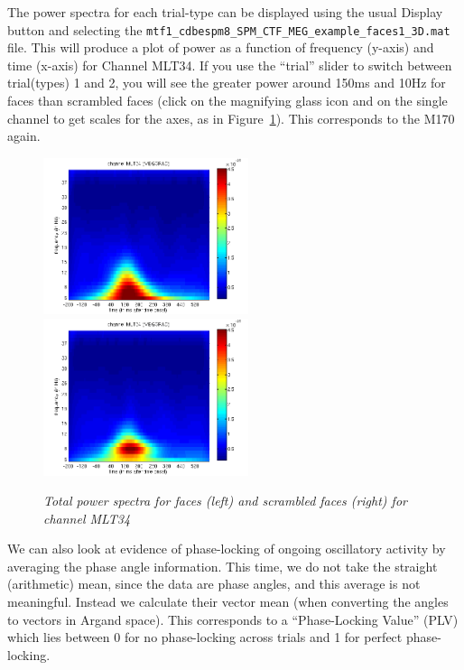 The power spectra for each trial-type can be displayed using the usual Display button and selecting the \texttt{mtf1\_\-cdbespm8\_\-SPM\_\-CTF\_\-MEG\_\-example\_\-faces1\_3D.mat} file. This will produce a plot of power as a function of frequency (y-axis) and time (x-axis) for Channel MLT34. If you use the ``trial'' slider to switch between trial(types) 1 and 2, you will see the greater power around 150ms and 10Hz for faces than scrambled faces (click on the magnifying glass icon and on the single channel to get scales for the axes, as in Figure~\ref{multimodal:fig:13}). This corresponds to the M170 again.

\begin{figure}
\begin{center}
\includegraphics[width=60mm]{multimodal/figures/meg_pow_faces}
\includegraphics[width=60mm]{multimodal/figures/meg_pow_scrambled}
\caption{\em  Total power spectra for faces (left) and scrambled faces (right) for channel MLT34\label{multimodal:fig:13}}
\end{center}
\end{figure}

We can also look at evidence of phase-locking of ongoing oscillatory activity by averaging the phase angle information. This time, we do not take the straight (arithmetic) mean, since the data are phase angles, and this average is not  meaningful. Instead we calculate their vector mean (when converting the angles to vectors in Argand space). This corresponds to a ``Phase-Locking Value'' (PLV) which lies between 0 for no phase-locking across trials and 1 for perfect phase-locking.

